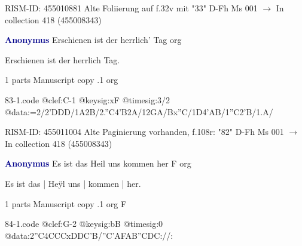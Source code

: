\documentclass[twocolumn]{book}
\begin{document}
\newline RISM-ID: 455010881
\newline Alte Foliierung auf f.32v mit "33"
\newline D-Fh  Ms 001
\newline $\rightarrow$ In collection 418 (455008343)

\newline \par \vspace{7pt} \textcolor{darkblue}{\textbf{Anonymus  }}
\newline Erschienen ist der herrlich' Tag    
\newline org
\newline \begin{itshape}[f.108r, heading:] Erschienen ist der herrlich Tag.\end{itshape} 
\newline \textcolor{darkblue}{}  1 parts  
\newline Manuscript copy
.1  org  
\begin{filecontents*}{83-1.code}
@clef:C-1
@keysig:xF
@timesig:3/2
@data:=2/2'DDD/1A2B/2.''C4'B2A/12GA/Bx''C/1D4'AB/1''C2'B/1.A/
\end{filecontents*}
\newline
%

\newline RISM-ID: 455011004
\newline Alte Paginierung vorhanden, f.108r: "82"
\newline D-Fh  Ms 001
\newline $\rightarrow$ In collection 418 (455008343)

\newline \par \vspace{7pt} \textcolor{darkblue}{\textbf{Anonymus  }}
\newline Es ist das Heil uns kommen her  F  
\newline org
\newline \begin{itshape}[f.28v, at left:] Es ist das | Heÿl uns | kommen | her.\end{itshape} 
\newline \textcolor{darkblue}{}  1 parts  
\newline Manuscript copy
.1  org  F  
\begin{filecontents*}{84-1.code}
@clef:G-2
@keysig:bB
@timesig:0
@data:2''C4CCCxDDC'B/''C'AFAB''CDC://:
\end{filecontents*}
\newline
%
\end{document}
